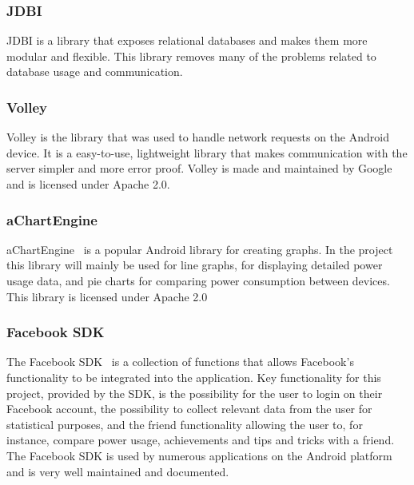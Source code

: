 \subsubsection{JDBI}
JDBI is a library that exposes relational databases and makes them more modular and flexible. This library removes many of the problems related to database usage and communication.

\subsubsection{Volley}
Volley is the library that was used to handle network requests on the Android device. It is a easy-to-use, lightweight library that makes communication with the server 
simpler and more error proof.  Volley is made and maintained by Google and is licensed under Apache 2.0.

\subsubsection{aChartEngine}
aChartEngine~\cite{achart} is a popular Android library for creating graphs. In the project this library will mainly be used for line graphs, for displaying detailed power 
usage data, and pie charts for comparing power consumption between devices. This library is licensed under Apache 2.0

\subsubsection{Facebook SDK}
The Facebook SDK~\cite{fsdk} is a collection of functions that allows Facebook’s functionality to be integrated into the application. Key functionality for this project, 
provided by the SDK, is the possibility for the user to login on their Facebook account, the possibility to collect relevant data from the user for statistical purposes, and the 
friend functionality allowing the user to, for instance, compare power usage, achievements and tips and tricks with a friend. The Facebook SDK is used by numerous applications 
on the Android platform and is very well maintained and documented. 
